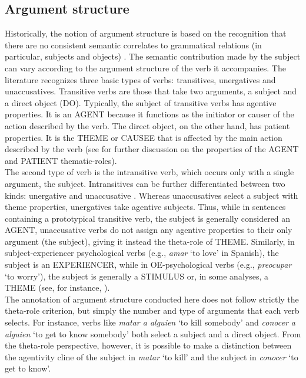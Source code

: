 \subsection{Argument structure}
Historically, the notion of argument structure is based on the recognition that there are no consistent semantic correlates to grammatical relations (in particular, subjects and objects) \parencite{waltereit2017argument}.
The semantic contribution made by the subject can vary according to the argument structure of the verb it accompanies. The literature \parencite{hale2002prolegomenon, levin2005argument} recognizes three basic types of verbs: transitives, unergatives and unaccusatives. Transitive verbs are those that take two arguments, a subject and a direct object (DO). Typically, the subject of transitive verbs has agentive properties. It is an {\selectfont AGENT} because it functions as the initiator or causer of the action described by the verb. The direct object, on the other hand, has patient properties. It is the {\selectfont THEME} or {\selectfont CAUSEE} that is affected by the main action described by the verb (see \cite{dowty1991thematic} for further discussion on the properties of the {\selectfont AGENT} and {\selectfont PATIENT} thematic-roles). \\
The second type of verb is the intransitive verb, which occurs only with a single argument, the subject. Intransitives can be further differentiated between two kinds: unergative and unaccusative \parencite{perlmutter1978impersonal}. Whereas unaccusatives select a subject with theme properties, unergatives take agentive subjects.
Thus, while in sentences containing a prototypical transitive verb, the subject is generally considered an {\selectfont AGENT}, unaccusative verbs do not assign any agentive properties to their only argument (the subject), giving it instead the theta-role of {\selectfont THEME}. Similarly, in subject-experiencer psychological verbs (e.g., \textit{amar} `to love' in Spanish), the subject is an {\selectfont EXPERIENCER}, while in OE-psychological verbs (e.g.,  \textit{preocupar} `to worry'), the subject is generally a {\selectfont STIMULUS} or, in some analyses, a {\selectfont THEME} (see, for instance, \cite{gutierrez2013structural}). \\
The annotation of argument structure conducted here does not follow strictly the theta-role criterion, but simply the number and type of arguments that each verb selects. For instance, verbs like \textit{matar a alguien} `to kill somebody' and \textit{conocer a alguien} `to get to know somebody' both select a subject and a direct object. From the theta-role perspective, however, it is possible to make a distinction between the agentivity cline of the subject in \textit{matar} `to kill' and the subject in \textit{conocer} `to get to know'. \\
